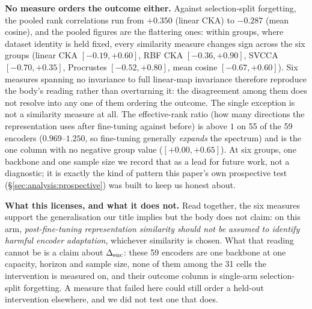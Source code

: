\textbf{No measure orders the outcome either.} Against selection-split
forgetting, the pooled rank correlations run from $+0.350$ (linear CKA) to
$-0.287$ (mean cosine), and the pooled figures are the flattering ones: within
groups, where dataset identity is held fixed, every similarity measure changes
sign across the six groups (linear CKA $[-0.19,{+}0.60]$, RBF CKA
$[-0.36,{+}0.90]$, SVCCA $[-0.70,{+}0.35]$, Procrustes $[-0.52,{+}0.80]$, mean
cosine $[-0.67,{+}0.60]$). Six measures spanning no invariance to full
linear-map invariance therefore reproduce the body's reading rather than
overturning it: the disagreement among them does not resolve into any one of them
ordering the outcome. The single exception is not a similarity measure at all.
The effective-rank ratio (how many directions the representation uses after
fine-tuning against before) is above $1$ on 55 of the 59 encoders
($0.969$--$1.250$, so fine-tuning generally \emph{expands} the spectrum) and is
the one column with no negative group value ($[+0.00,{+}0.65]$). At six groups,
one backbone and one sample size we record that as a lead for future work, not a
diagnostic; it is exactly the kind of pattern this paper's own prospective test
(\S\ref{sec:analysis:prospective}) was built to keep us honest about.

\textbf{What this licenses, and what it does not.} Read together, the six
measures support the generalisation our title implies but the body does not
claim: on this arm, \emph{post-fine-tuning representation similarity should not
be assumed to identify harmful encoder adaptation}, whichever similarity is
chosen. What that reading cannot be is a claim about $\Delta_\text{enc}$: these 59 encoders
are one backbone at one capacity, horizon and sample size, none of them among the
31 cells the intervention is measured on, and their outcome column is
single-arm selection-split forgetting. A measure that failed here could still
order a held-out intervention elsewhere, and we did not test one that does.

